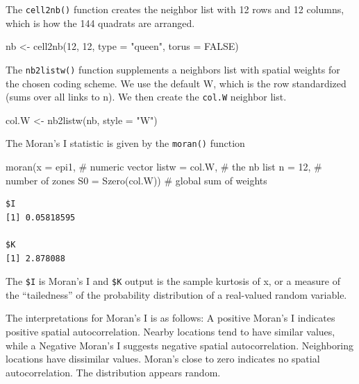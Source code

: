 \documentclass[
  letterpaper,
]{book}
\newenvironment{Shaded}{\begin{snugshade}}{\end{snugshade}}
\newcommand{\AttributeTok}[1]{\textcolor[rgb]{0.40,0.45,0.13}{#1}}
\newcommand{\CommentTok}[1]{\textcolor[rgb]{0.37,0.37,0.37}{#1}}
\newcommand{\ConstantTok}[1]{\textcolor[rgb]{0.56,0.35,0.01}{#1}}
\newcommand{\DecValTok}[1]{\textcolor[rgb]{0.68,0.00,0.00}{#1}}
\newcommand{\FunctionTok}[1]{\textcolor[rgb]{0.28,0.35,0.67}{#1}}
\newcommand{\NormalTok}[1]{\textcolor[rgb]{0.00,0.23,0.31}{#1}}
\newcommand{\OtherTok}[1]{\textcolor[rgb]{0.00,0.23,0.31}{#1}}
\newcommand{\StringTok}[1]{\textcolor[rgb]{0.13,0.47,0.30}{#1}}
\begin{document}
The \texttt{cell2nb()} function creates the neighbor list with 12 rows
and 12 columns, which is how the 144 quadrats are arranged.

\begin{Shaded}
\begin{Highlighting}[]
\NormalTok{nb }\OtherTok{\textless{}{-}} \FunctionTok{cell2nb}\NormalTok{(}\DecValTok{12}\NormalTok{, }\DecValTok{12}\NormalTok{, }\AttributeTok{type =} \StringTok{"queen"}\NormalTok{, }\AttributeTok{torus =} \ConstantTok{FALSE}\NormalTok{)}
\end{Highlighting}
\end{Shaded}

The \texttt{nb2listw()} function supplements a neighbors list with
spatial weights for the chosen coding scheme. We use the default W,
which is the row standardized (sums over all links to n). We then create
the \texttt{col.W} neighbor list.

\begin{Shaded}
\begin{Highlighting}[]
\NormalTok{col.W }\OtherTok{\textless{}{-}} \FunctionTok{nb2listw}\NormalTok{(nb, }\AttributeTok{style =} \StringTok{"W"}\NormalTok{)}
\end{Highlighting}
\end{Shaded}

The Moran's I statistic is given by the \texttt{moran()} function

\begin{Shaded}
\begin{Highlighting}[]
\FunctionTok{moran}\NormalTok{(}\AttributeTok{x =}\NormalTok{ epi1, }\CommentTok{\# numeric vector}
      \AttributeTok{listw =}\NormalTok{ col.W, }\CommentTok{\# the nb list}
      \AttributeTok{n =} \DecValTok{12}\NormalTok{, }\CommentTok{\# number of zones}
      \AttributeTok{S0 =} \FunctionTok{Szero}\NormalTok{(col.W)) }\CommentTok{\# global sum of weights}
\end{Highlighting}
\end{Shaded}

\begin{verbatim}
$I
[1] 0.05818595

$K
[1] 2.878088
\end{verbatim}

The \texttt{\$I} is Moran's I and \texttt{\$K} output is the sample
kurtosis of x, or a measure of the ``tailedness'' of the probability
distribution of a real-valued random variable.

The interpretations for Moran's I is as follows: A positive Moran's I
indicates positive spatial autocorrelation. Nearby locations tend to
have similar values, while a Negative Moran's I suggests negative
spatial autocorrelation. Neighboring locations have dissimilar values.
Moran's close to zero indicates no spatial autocorrelation. The
distribution appears random.
\end{document}
